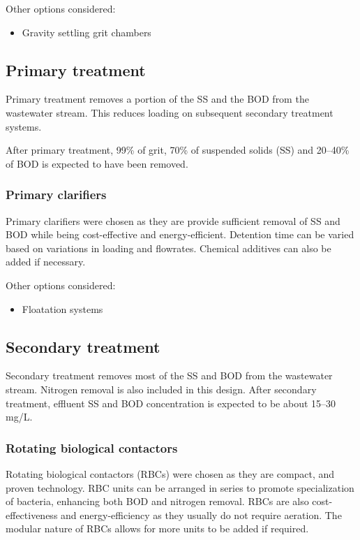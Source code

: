 \documentclass[a4paper,10pt]{article}
\begin{document}
Other options considered:
\begin{itemize}
\item Gravity settling grit chambers
\end{itemize}


\subsection{Primary treatment}
Primary treatment removes a portion of the SS and the BOD from the wastewater stream. This reduces loading on subsequent secondary treatment systems.

After primary treatment, 99\% of grit, 70\% of suspended solids (SS) and 20--40\% of BOD is expected to have been removed.

\subsubsection{Primary clarifiers}
\label{sec:primary_clarifiers}
Primary clarifiers were chosen as they are provide sufficient removal of SS and BOD while being cost-effective and energy-efficient. Detention time can be varied based on variations in loading and flowrates. Chemical additives can also be added if necessary.

Other options considered:
\begin{itemize}
\item Floatation systems
\end{itemize}


\subsection{Secondary treatment}
Secondary treatment removes most of the SS and BOD from the wastewater stream. Nitrogen removal is also included in this design. After secondary treatment, effluent SS and BOD concentration is expected to be about 15--30\,mg/L.

\subsubsection{Rotating biological contactors}
Rotating biological contactors (RBCs) were chosen as they are compact, and proven technology. RBC units can be arranged in series to promote specialization of bacteria, enhancing both BOD and nitrogen removal. RBCs are also cost-effectiveness and energy-efficiency as they usually do not require aeration. The modular nature of RBCs allows for more units to be added if required.
\end{document}
